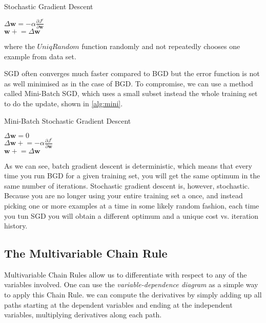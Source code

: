 \documentclass[12pt]{article}
\newcommand{\pluseq}{\mathrel{+}=}
\numberwithin{equation}{section}
\begin{document}
\begin{algorithm}[H] 
  \caption{Stochastic Gradient Descent} \label{alg:sgd}
  
   {
     {
       $\Delta\bm{w} = -\alpha\frac{\partial J^{r}}{\partial \bm{w}}$ \\
       $\bm{w} \pluseq \Delta\bm{w}$
    }
  }
\end{algorithm}
where the $UniqRandom$ function randomly and not repeatedly chooses one example from data set. 

SGD often converges much faster compared to BGD but the error function is not as well minimised as in the case of BGD. 
To compromise, we can use a method called Mini-Batch SGD, which uses a small subset instead the whole training set to do the update, shown in \autoref{alg:mini}.

\begin{algorithm}[H] 
  \caption{Mini-Batch Stochastic Gradient Descent} \label{alg:mini}
  
   {
      {
       $\Delta\bm{w} = 0$ \\
        {
         $\Delta\bm{w} \pluseq -\alpha\frac{\partial J^{r}}{\partial \bm{w}}$ \\
       }
       $\bm{w} \pluseq \Delta\bm{w}$
    }
  }
\end{algorithm}

As we can see, batch gradient descent is deterministic, which means that every time you run BGD for a given training set, 
you will get the same optimum in the same number of iterations.  
Stochastic gradient descent is, however, stochastic.  Because you are no longer using your entire training set a once, 
and instead picking one or more examples at a time in some likely random fashion, 
each time you tun SGD you will obtain a different optimum and a unique cost vs. iteration history.

\subsection{The Multivariable Chain Rule}
Multivariable Chain Rules allow us to differentiate with respect to any of the variables involved.
One can use the \textit{variable-dependence diagram} as a simple way to apply this Chain Rule. 
we can compute the derivatives by 
simply adding up all paths starting at the dependent variables and ending at the independent variables, 
multiplying derivatives along each path.
\end{document}
